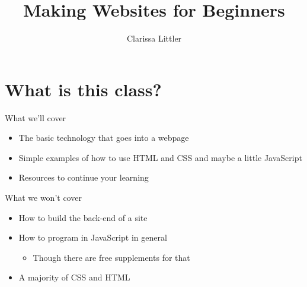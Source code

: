 \documentclass{beamer}
\author{Clarissa Littler}
\title{Making Websites for Beginners}
\date{}
\begin{document}

\begin{frame}
\maketitle
\end{frame}

\section{What is this class?}
\begin{frame}{What we'll cover}
  \begin{itemize}
    \item The basic technology that goes into a webpage \pause
    \item Simple examples of how to use HTML and CSS \pause and \alert{maybe} a little JavaScript \pause
    \item Resources to continue your learning
  \end{itemize}
\end{frame}

\begin{frame}{What we won't cover}
  \begin{itemize}
    \item How to build the back-end of a site \pause
    \item How to program in JavaScript in general \pause
      \begin{itemize}
        \item Though there are free supplements for that \pause
      \end{itemize}
    \item A majority of CSS and HTML
  \end{itemize}
\end{frame}
\end{document}
